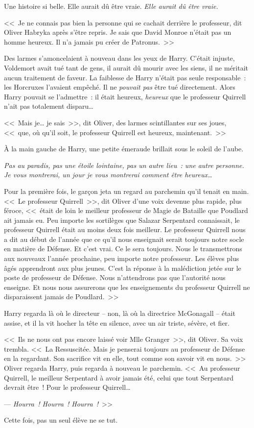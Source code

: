 Une histoire si belle. Elle aurait dû être vraie. \emph{Elle aurait dû être vraie.}

<<~Je ne connais pas bien la personne qui se cachait derrière le professeur, dit Oliver Habryka après s'être repris. Je sais que David Monroe n'était pas un homme heureux. Il n'a jamais pu créer de Patronus.~>>

Des larmes s'amoncelaient à nouveau dans les yeux de Harry. C'était injuste, Voldemort avait tué tant de gens, il aurait dû mourir avec les siens, il ne méritait aucun traitement de faveur. La faiblesse de Harry n'était pas seule responsable~: les Horcruxes l'avaient empêché. Il ne \emph{pouvait pas} être tué directement. Alors Harry pouvait se l'admettre~: il était heureux, \emph{heureux} que le professeur Quirrell n'ait pas totalement disparu…

<<~Mais je… je sais~>>, dit Oliver, des larmes scintillantes sur ses joues, <<~que, où qu'il soit, le professeur Quirrell est heureux, maintenant.~>>

À la main gauche de Harry, une petite émeraude brillait sous le soleil de l'aube.

\emph{Pas au paradis, pas une étoile lointaine, pas un autre lieu~: une autre personne. Je vous montrerai, un jour je vous montrerai comment être heureux…}

Pour la première fois, le garçon jeta un regard au parchemin qu'il tenait en main. <<~Le professeur Quirrell~>>, dit Oliver d'une voix devenue plus rapide, plus féroce, <<~était de loin le meilleur professeur de Magie de Bataille que Poudlard ait jamais eu. Peu importe les sortilèges que Salazar Serpentard connaissait, le professeur Quirrell était au moins deux fois meilleur. Le professeur Quirrell nous a dit au début de l'année que ce qu'il nous enseignait serait toujours notre socle en matière de Défense. Et c'est vrai. Ce le sera toujours. Nous le transmettrons aux nouveaux l'année prochaine, peu importe notre professeur. Les élèves plus âgés apprendront aux plus jeunes. C'est la réponse à la malédiction jetée sur le poste de professeur de Défense. Nous n'attendrons pas que l'autorité nous enseigne. Et nous nous assurerons que les enseignements du professeur Quirrell ne disparaissent jamais de Poudlard.~>>

Harry regarda là où le directeur -- non, là où la directrice McGonagall -- était assise, et il la vit hocher la tête en silence, avec un air triste, sévère, et fier.

<<~Ils ne nous ont pas encore laissé voir Mlle Granger~>>, dit Oliver. Sa voix trembla. <<~La Ressuscitée. Mais je penserai toujours au professeur de Défense en la regardant. Son sacrifice vit en elle, tout comme son savoir vit en nous.~>> Oliver regarda Harry, puis regarda à nouveau le parchemin. <<~Au professeur Quirrell, le meilleur Serpentard à avoir jamais été, celui que tout Serpentard devrait être~! Pour le professeur Quirrell…

--- \emph{Hourra~! Hourra~! Hourra~!}~>>

Cette fois, pas un seul élève ne se tut.
